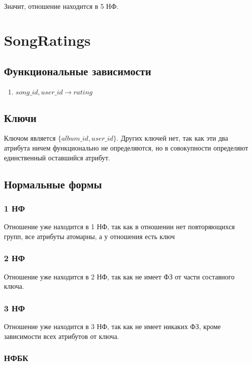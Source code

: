 \documentclass{article}
\begin{document}
	Значит, отношение находится в 5 НФ.

\section{SongRatings}

\subsection{Функциональные зависимости}
\begin{enumerate}
	\item $song\_id, user\_id \rightarrow rating$
\end{enumerate}

\subsection{Ключи}

Ключом является $\{album\_id, user\_id\}$. Других ключей нет, так как эти два атрибута ничем функционально не определяются, но в совокупности определяют единственный оставшийся атрибут.

\subsection{Нормальные формы}

\subsubsection{1 НФ}

Отношение уже находится в 1 НФ, так как в отношении нет повторяющихся групп, все атрибуты атомарны, а у отношения есть ключ

\subsubsection{2 НФ}

Отношение уже находится в 2 НФ, так как не имеет ФЗ от части составного ключа.

\subsubsection{3 НФ}

Отношение уже находится в 3 НФ, так как не имеет никаких ФЗ, кроме зависимости всех атрибутов от ключа.

\subsubsection{НФБК}
\end{document}
